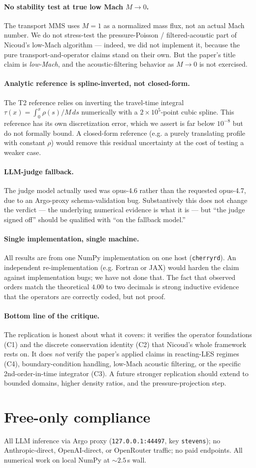 \documentclass[11pt]{article}
\begin{document}
\paragraph{No stability test at true low Mach $M\to 0$.}
The transport MMS uses \(M=1\) as a normalized mass flux, not an actual
Mach number. We do not stress-test the pressure-Poisson / filtered-acoustic
part of Nicoud's low-Mach algorithm --- indeed, we did not implement it,
because the pure transport-and-operator claims stand on their own. But the
paper's title claim is \emph{low-Mach}, and the acoustic-filtering behavior
as \(M\to 0\) is not exercised.

\paragraph{Analytic reference is spline-inverted, not closed-form.}
The T2 reference relies on inverting the travel-time integral
\(\tau(x)=\int_0^x\rho(s)/M\,ds\) numerically with a
\(2\times 10^5\)-point cubic spline. This reference has its own
discretization error, which we assert is far below \(10^{-8}\) but do not
formally bound. A closed-form reference (e.g. a purely translating profile
with constant \(\rho\)) would remove this residual uncertainty at the cost
of testing a weaker case.

\paragraph{LLM-judge fallback.}
The judge model actually used was opus-4.6 rather than the requested
opus-4.7, due to an Argo-proxy schema-validation bug. Substantively this
does not change the verdict --- the underlying numerical evidence is what it
is --- but ``the judge signed off'' should be qualified with ``on the
fallback model.''

\paragraph{Single implementation, single machine.}
All results are from one NumPy implementation on one host (\texttt{cherryrd}).
An independent re-implementation (e.g. Fortran or JAX) would harden the
claim against implementation bugs; we have not done that. The fact that
observed orders match the theoretical \(4.00\) to two decimals is strong
inductive evidence that the operators are correctly coded, but not proof.

\paragraph{Bottom line of the critique.}
The replication is honest about what it covers: it verifies the operator
foundations (C1) and the discrete conservation identity (C2) that Nicoud's
whole framework rests on. It does \emph{not} verify the paper's applied
claims in reacting-LES regimes (C4), boundary-condition handling, low-Mach
acoustic filtering, or the specific 2nd-order-in-time integrator (C3). A
future stronger replication should extend to bounded domains, higher
density ratios, and the pressure-projection step.

\section{Free-only compliance}
All LLM inference via Argo proxy (\texttt{127.0.0.1:44497}, key
\texttt{stevens}); no Anthropic-direct, OpenAI-direct, or OpenRouter traffic;
no paid endpoints. All numerical work on local NumPy at \(\sim 2.5\)\,s wall.
\end{document}
